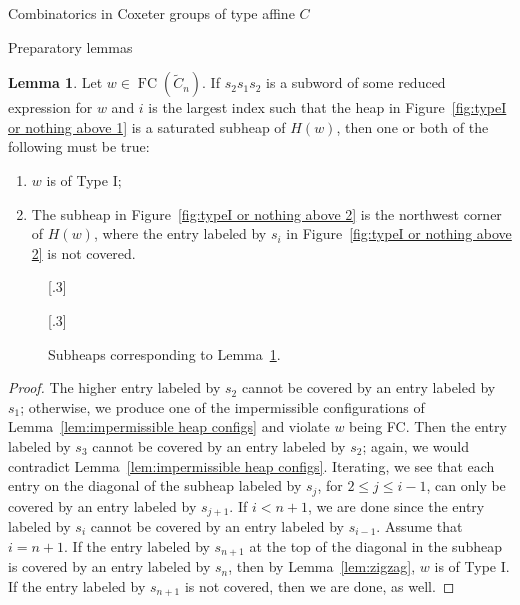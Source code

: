 \documentclass[11pt]{amsart}
\theoremstyle{definition}
\newtheorem{lemma}[theorem]{Lemma}
\numberwithin{equation}{section}
\newcommand{\C}{\widetilde{C}}
\renewcommand{\(}{\left(}
\renewcommand{\)}{\right)}
\DeclareMathOperator{\FC}{FC}
\newcommand\xxaxis{0}
\newcommand\yyaxis{90}
\newcommand\heapblock[3]{\fill[draw=black, fill=gray!30, rounded corners, line width=1.1pt, shift={(\xxaxis:#1)},shift={(\yyaxis:#2)}] (-1,-0.5) rectangle (1,0.5);\node at (#1,#2) {\scriptsize $#3$};}
\newcommand\heapblank[2]{\fill[fill=white, dotted, draw=black, line width=1.1pt, rounded corners, shift={(\xxaxis:#1)},shift={(\yyaxis:#2)}] (-1,-0.5) rectangle (1,0.5);}
\begin{document}
\begin{section}{Combinatorics in Coxeter groups of type affine $C$}
\begin{subsection}{Preparatory lemmas}
\begin{lemma}\label{lem:typeI or nothing above}
Let $w \in \FC(\C_{n})$.  If $s_{2}s_{1}s_{2}$ is a subword of some reduced expression for $w$ and $i$ is the largest index such that the heap in Figure~\ref{fig:typeI or nothing above 1} is a saturated subheap of $H(w)$, then one or both of the following must be true:
\begin{enumerate}[label=\rm{(\arabic*)}]
\item $w$ is of Type I; 
\item The subheap in Figure~\ref{fig:typeI or nothing above 2} is the northwest corner of $H(w)$, where the entry labeled by $s_{i}$ in Figure~\ref{fig:typeI or nothing above 2} is not covered.
\end{enumerate}
\end{lemma}

\begin{figure}[!ht]
\subcaptionbox{\label{fig:typeI or nothing above 1}}[.3\textwidth]{
}
\subcaptionbox{\label{fig:typeI or nothing above 2}}[.3\textwidth]{
}
\caption{Subheaps corresponding to Lemma~\ref{lem:typeI or nothing above}.}
\end{figure}

\begin{proof}
The higher entry labeled by $s_{2}$ cannot be covered by an entry labeled by $s_{1}$; otherwise, we produce one of the impermissible configurations of Lemma~\ref{lem:impermissible heap configs} and violate $w$ being FC.  Then the entry labeled by $s_{3}$ cannot be covered by an entry labeled by $s_{2}$; again, we would contradict Lemma~\ref{lem:impermissible heap configs}.  Iterating, we see that each entry on the diagonal of the subheap labeled by $s_{j}$, for $2 \leq j \leq i-1$, can only be covered by an entry labeled by $s_{j+1}$.  If $i<n+1$, we are done since the entry labeled by $s_{i}$ cannot be covered by an entry labeled by $s_{i-1}$.  Assume that $i=n+1$.  If the entry labeled by $s_{n+1}$ at the top of the diagonal in the subheap is covered by an entry labeled by $s_{n}$, then by Lemma~\ref{lem:zigzag}, $w$ is of Type I.  If the entry labeled by $s_{n+1}$ is not covered, then we are done, as well.
\end{proof}


\end{subsection}
\end{section}
\end{document}
